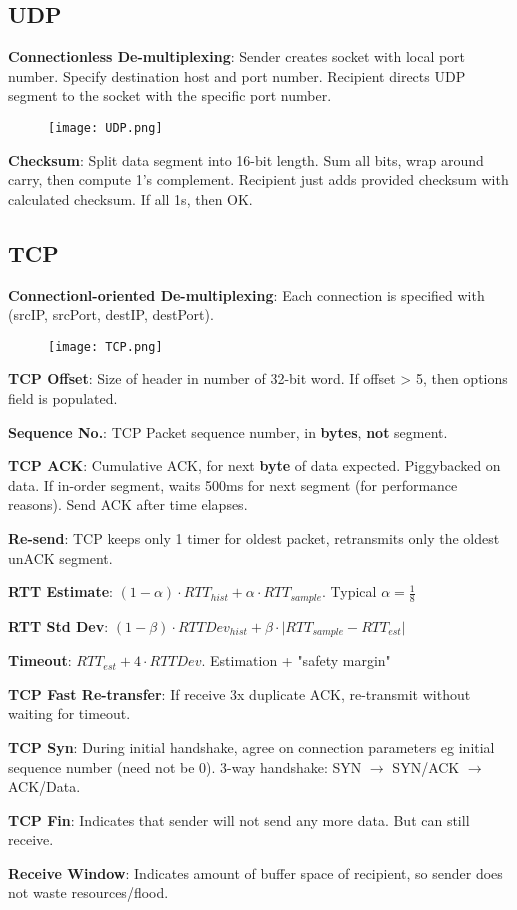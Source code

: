 \documentclass[a4paper,landscape]{article}
\newcommand{\rntopic}[1]{\vspace{-2.0em}\subsection*{#1}\vspace{-1.0em}}
\newcommand{\rnname}[1]{\textbf{#1}}
\begin{document}
\begin{multicols*}{4}
\begin{flatitemize}
\end{flatitemize}
\rntopic{UDP}
\begin{flatitemize}

\item \rnname{Connectionless De-multiplexing}: Sender creates socket with local port number. Specify destination host and port number. Recipient directs UDP segment to the socket with the specific port number.\\
    \begin{figure}[H]
      \texttt{[image: UDP.png]}
    \end{figure}
\item \rnname{Checksum}: Split data segment into 16-bit length. Sum all bits, wrap around carry, then compute 1's complement. Recipient just adds provided checksum with calculated checksum. If all 1s, then OK.
\end{flatitemize}
\rntopic{TCP}
\begin{flatitemize}

\item \rnname{Connectionl-oriented De-multiplexing}: Each connection is specified with (srcIP, srcPort, destIP, destPort).\\
    \begin{figure}[H]
      \texttt{[image: TCP.png]}
    \end{figure}
\item \rnname{TCP Offset}: Size of header in number of 32-bit word. If offset > 5, then options field is populated.
\item \rnname{Sequence No.}: TCP Packet sequence number, in \textbf{bytes}, \textbf{not} segment.
\item \rnname{TCP ACK}: Cumulative ACK, for next \textbf{byte} of data expected. Piggybacked on data. If in-order segment, waits 500ms for next segment (for performance reasons). Send ACK after time elapses.
\item \rnname{Re-send}: TCP keeps only 1 timer for oldest packet, retransmits only the oldest unACK segment. 
\item \rnname{RTT Estimate}: $(1-\alpha) \cdot RTT_{hist} + \alpha \cdot RTT_{sample}$. Typical $\alpha = \frac{1}{8}$
\item \rnname{RTT Std Dev}: $(1-\beta) \cdot RTTDev_{hist} + \beta \cdot |{RTT_{sample} - RTT_{est}|} $
\item \rnname{Timeout}: $RTT_{est} + 4 \cdot RTTDev$. Estimation + "safety margin"
\item \rnname{TCP Fast Re-transfer}: If receive 3x duplicate ACK, re-transmit without waiting for timeout.
\item \rnname{TCP Syn}: During initial handshake, agree on connection parameters eg initial sequence number (need not be 0). 3-way handshake: SYN $\rightarrow$ SYN/ACK $\rightarrow$ ACK/Data.
\item \rnname{TCP Fin}: Indicates that sender will not send any more data. But can still receive.
\item \rnname{Receive Window}: Indicates amount of buffer space of recipient, so sender does not waste resources/flood.
\end{flatitemize}


\end{multicols*}
\end{document}
